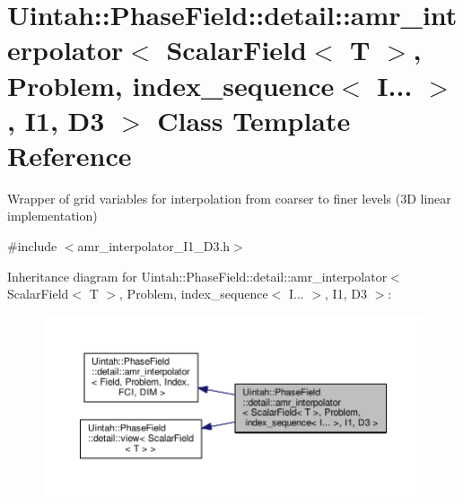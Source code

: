 \hypertarget{classUintah_1_1PhaseField_1_1detail_1_1amr__interpolator_3_01ScalarField_3_01T_01_4_00_01Problemdf68628a6010a1e1526666730125c372}{}\section{Uintah\+:\+:Phase\+Field\+:\+:detail\+:\+:amr\+\_\+interpolator$<$ Scalar\+Field$<$ T $>$, Problem, index\+\_\+sequence$<$ I... $>$, I1, D3 $>$ Class Template Reference}
\label{classUintah_1_1PhaseField_1_1detail_1_1amr__interpolator_3_01ScalarField_3_01T_01_4_00_01Problemdf68628a6010a1e1526666730125c372}


Wrapper of grid variables for interpolation from coarser to finer levels (3D linear implementation)  




{\ttfamily \#include $<$amr\+\_\+interpolator\+\_\+\+I1\+\_\+\+D3.\+h$>$}



Inheritance diagram for Uintah\+:\+:Phase\+Field\+:\+:detail\+:\+:amr\+\_\+interpolator$<$ Scalar\+Field$<$ T $>$, Problem, index\+\_\+sequence$<$ I... $>$, I1, D3 $>$\+:\nopagebreak
\begin{figure}[H]
\begin{center}
\leavevmode
\includegraphics[width=350pt]{classUintah_1_1PhaseField_1_1detail_1_1amr__interpolator_3_01ScalarField_3_01T_01_4_00_01Problem754fdc2afe2dd55c64d406f42defc6a3}
\end{center}
\end{figure}


